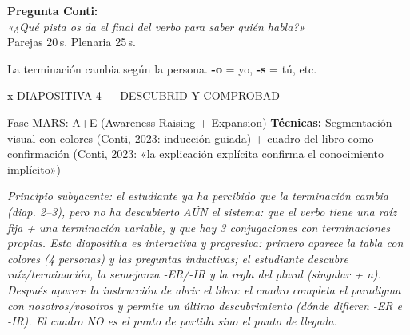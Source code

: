 \documentclass[a4paper,10pt]{article}
\begin{document}
\vspace{0.5cm}

\begin{preguntabox}
\centering\large\textbf{Pregunta Conti:}\\[0.3cm]
{\Large\textit{«¿Qué pista os da el final del verbo para saber quién habla?»}}\\[0.3cm]
{\normalsize Parejas 20\,s. Plenaria 25\,s.}
\end{preguntabox}

\vspace{0.4cm}

\begin{estrategiabox}
{\small La terminación cambia según la persona. \textbf{-o} = yo, \textbf{-s} = tú, etc.}
\end{estrategiabox}

\newpage


\begin{diapheader}{x}
DIAPOSITIVA 4 — DESCUBRID Y COMPROBAD
\end{diapheader}

\vspace{0.3cm}

\begin{marsbox}{Fase MARS: A+E (Awareness Raising + Expansion)}
\textbf{Técnicas:} Segmentación visual con colores (Conti, 2023: inducción guiada) + cuadro del libro como confirmación (Conti, 2023: «la explicación explícita confirma el conocimiento implícito»)
\end{marsbox}

\vspace{0.2cm}

{\small\textit{Principio subyacente: el estudiante ya ha percibido que la terminación cambia (diap. 2--3), pero no ha descubierto AÚN el sistema: que el verbo tiene una raíz fija + una terminación variable, y que hay 3 conjugaciones con terminaciones propias. Esta diapositiva es interactiva y progresiva: primero aparece la tabla con colores (4 personas) y las preguntas inductivas; el estudiante descubre raíz/terminación, la semejanza -ER/-IR y la regla del plural (singular + n). Después aparece la instrucción de abrir el libro: el cuadro completa el paradigma con nosotros/vosotros y permite un último descubrimiento (dónde difieren -ER e -IR). El cuadro NO es el punto de partida sino el punto de llegada.}}
\end{document}
